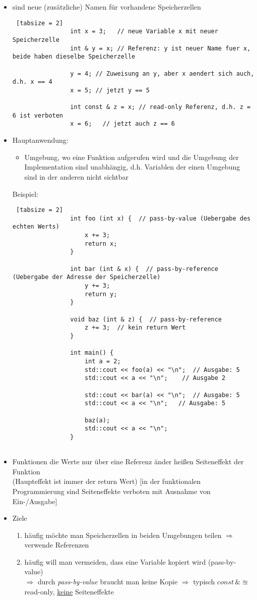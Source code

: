 \documentclass{article}
\begin{document}
	 	\begin{itemize}
	 		\item sind neue (zusätzliche) Namen für vorhandene Speicherzellen
	 		
	 		\begin{lstlisting} [tabsize = 2]
		 		int x = 3;   // neue Variable x mit neuer Speicherzelle
		 		int & y = x; // Referenz: y ist neuer Name fuer x, beide haben dieselbe Speicherzelle
		 		
		 		y = 4; // Zuweisung an y, aber x aendert sich auch, d.h. x == 4
		 		x = 5; // jetzt y == 5
		 		
		 		int const & z = x; // read-only Referenz, d.h. z = 6 ist verboten
		 		x = 6;   // jetzt auch z == 6
	 		\end{lstlisting}
	 		\item Hauptanwendung:
	 		\begin{itemize}
	 			\item Umgebung, wo eine Funktion aufgerufen wird und die Umgebung der Implementation sind unabhängig, d.h. Variablen der einen Umgebung sind in der anderen nicht sichtbar
	 		\end{itemize}
	 		Beispiel: 
	 		\begin{lstlisting} [tabsize = 2]
		 		int foo (int x) {  // pass-by-value (Uebergabe des echten Werts)
			 		x += 3;
			 		return x;
		 		}
		 		
		 		int bar (int & x) {  // pass-by-reference (Uebergabe der Adresse der Speicherzelle)
			 		y += 3;
			 		return y;
		 		}
		 		
		 		void baz (int & z) {  // pass-by-reference
			 		z += 3;  // kein return Wert
		 		}
		 		
			 	int main() {
			 		int a = 2;
			 		std::cout << foo(a) << "\n";  // Ausgabe: 5
			 		std::cout << a << "\n";    // Ausgabe 2
			 		
			 		std::cout << bar(a) << "\n";  // Ausgabe: 5
			 		std::cout << a << "\n";   // Ausgabe: 5
			 		
			 		baz(a);
			 		std::cout << a << "\n";
		 		}
		 		
	 		\end{lstlisting}
	 		\item Funktionen die Werte nur über eine Referenz änder heißen Seiteneffekt der Funktion \\
	 		(Haupteffekt ist immer der return Wert) [in der funktionalen Programmierung sind Seiteneffekte verboten mit Ausnahme von Ein-/Ausgabe]

	 	\item Ziele
	 	\begin{enumerate}
	 		\item häufig möchte man Speicherzellen in beiden Umgebungen teilen $\Rightarrow$ verwende Referenzen
	 		\item häufig will man vermeiden, dass eine Variable kopiert wird (pass-by-value) \\
	 		$\Rightarrow$ durch \textit{pass-by-value} braucht man keine Kopie $\Rightarrow$ typisch $const \, \& \approxeq$ read-only, \underline{keine} Seiteneffekte
	 	\end{enumerate}
	 	

\end{itemize}
\end{document}
